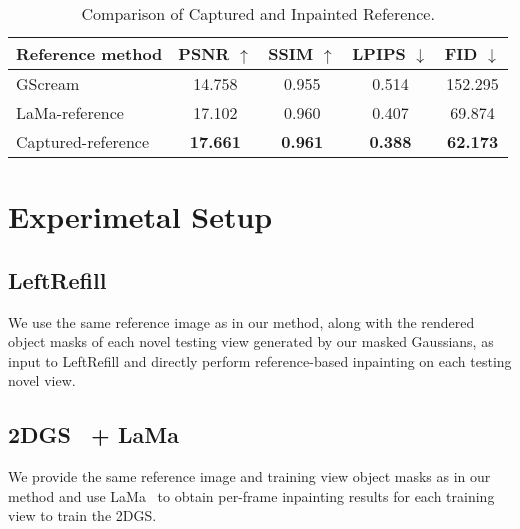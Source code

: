 \begin{table}[h]
\centering
\footnotesize
\caption{Comparison of Captured and Inpainted Reference.}
\label{tab:ref_inpain_quan}  %
\resizebox{\columnwidth}{!} {
\begin{tabular}{l|cccc}
\toprule
Reference method & PSNR $\uparrow$ & SSIM $\uparrow$ & LPIPS $\downarrow$ & FID $\downarrow$ \\
\midrule
GScream & 14.758 & 0.955 & 0.514 & 152.295 \\
LaMa-reference & 17.102 & 0.960 & 0.407 & 69.874 \\ 
Captured-reference &  \textbf{17.661} & \textbf{0.961}  & \textbf{0.388} & \textbf{62.173} \\
\bottomrule
\end{tabular}
}
\vspace{-1pc}
\end{table}




\section{Experimetal Setup}
\label{sec:compared_method}


\subsection{LeftRefill~\cite{cao2024leftrefill}}
We use the same reference image as in our method, along with the rendered object masks of each novel testing view generated by our masked Gaussians, as input to LeftRefill and directly perform reference-based inpainting on each testing novel view.


\subsection{2DGS~\cite{huang20242d} + LaMa~\cite{lama}}
We provide the same reference image and training view object masks as in our method and use LaMa~\cite{lama} to obtain per-frame inpainting results for each training view to train the 2DGS.

